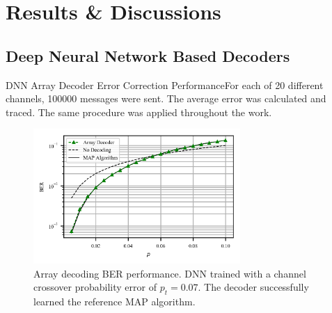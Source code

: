 \documentclass{beamer}
\begin{document}




\section{Results \& Discussions}
\subsection{Deep Neural Network Based Decoders}
\begin{frame}{DNN Array Decoder Error Correction Performance}{For each of 20 different channels, 100000 messages were sent. The average error was calculated and traced. The same procedure was applied throughout the work.}
 
 \begin{figure}[!ht]
  \centering
    \includegraphics[width=0.7\textwidth]{images/MLNN_Mep_65536_ptrain_007}
    \caption{Array decoding BER performance. DNN trained with a channel crossover probability error of $p_t=0.07$. The decoder successfully learned the reference MAP algorithm.}\label{fig:ArrayD}
\end{figure}
 

\end{frame}
\end{document}
